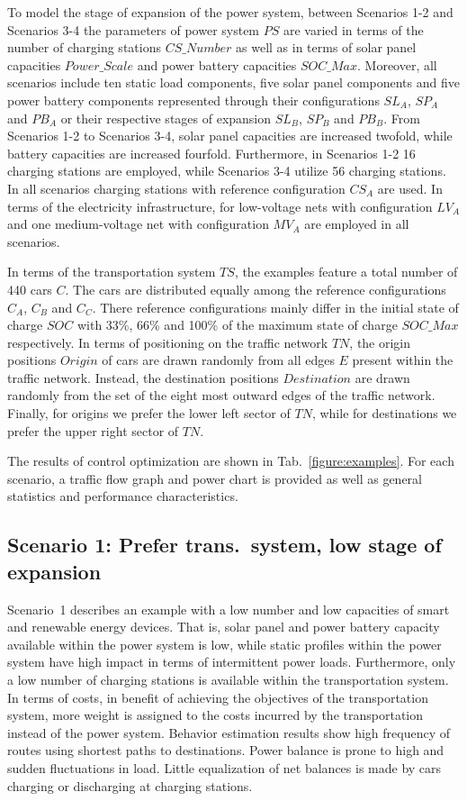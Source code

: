 To model the stage of expansion of the power system, between Scenarios 1-2 and Scenarios 3-4 the parameters of power system $PS$ are varied in terms of the number of charging stations $CS\_Number$ as well as in terms of solar panel capacities $Power\_Scale$ and power battery capacities $SOC\_Max$. Moreover, all scenarios include ten static load components, five solar panel components and five power battery components represented through their configurations $SL_{A}$, $SP_{A}$ and $PB_{A}$ or their respective stages of expansion $SL_{B}$, $SP_{B}$ and $PB_{B}$. From Scenarios 1-2 to Scenarios 3-4, solar panel capacities are increased twofold, while battery capacities are increased fourfold. Furthermore, in Scenarios 1-2 16 charging stations are employed, while Scenarios 3-4 utilize 56 charging stations. In all scenarios charging stations with reference configuration $CS_{A}$ are used. In terms of the electricity infrastructure, for low-voltage nets with configuration $LV_{A}$ and one medium-voltage net with configuration $MV_{A}$ are employed in all scenarios. 

In terms of the transportation system $TS$, the examples feature a total number of 440 cars $C$. The cars are distributed equally among the reference configurations $C_{A}$, $C_{B}$ and $C_{C}$. There reference configurations mainly differ in the initial state of charge $SOC$ with 33\%, 66\% and 100\% of the maximum state of charge $SOC\_Max$ respectively. In terms of positioning on the traffic network $TN$, the origin positions $Origin$ of cars are drawn randomly from all edges $E$ present within the traffic network. Instead, the destination positions $Destination$ are drawn randomly from the set of the eight most outward edges of the traffic network. Finally, for origins we prefer the lower left sector of $TN$, while for destinations we prefer the upper right sector of $TN$.

The results of control optimization are shown in Tab.~\ref{figure:examples}. For each scenario, a traffic flow graph and power chart is provided as well as general statistics and performance characteristics.

\subsection*{Scenario 1: Prefer trans.\ system, low stage of expansion}

Scenario~1 describes an example with a low number and low capacities of smart and renewable energy devices. That is, solar panel and power battery capacity available within the power system is low, while static profiles within the power system have high impact in terms of intermittent power loads. Furthermore, only a low number of charging stations is available within the transportation system. In terms of costs, in benefit of achieving the objectives of the transportation system, more weight is assigned to the costs incurred by the transportation instead of the power system. Behavior estimation results show high frequency of routes using shortest paths to destinations. Power balance is prone to high and sudden fluctuations in load. Little equalization of net balances is made by cars charging or discharging at charging stations.

